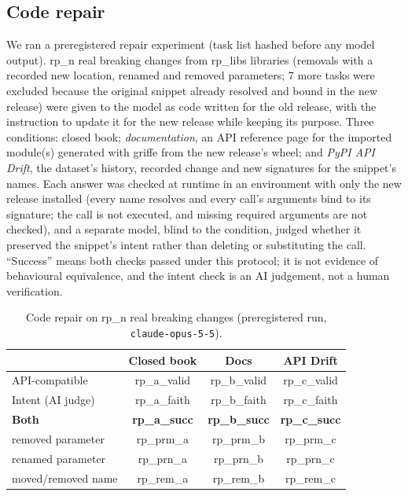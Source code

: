 \documentclass[10pt,twocolumn,letterpaper]{article}
\begin{document}
\subsection{Code repair}
We ran a preregistered repair experiment (task list hashed before any model output). {{rp_n}} real breaking changes
from {{rp_libs}} libraries (removals with a recorded new location, renamed and removed parameters; 7 more tasks were
excluded because the original snippet already resolved and bound in the new release) were given to the model as code
written for the old release, with the instruction to update it for the new release while keeping its purpose. Three
conditions: closed book; \emph{documentation}, an API reference page for the imported module(s) generated with griffe
from the new release's wheel; and \emph{PyPI API Drift}, the dataset's history, recorded change and new signatures for
the snippet's names. Each answer was checked at runtime in an environment with only the new release installed (every
name resolves and every call's arguments bind to its signature; the call is not executed, and missing required
arguments are not checked), and a separate model, blind to the condition, judged whether it preserved the snippet's
intent rather than deleting or substituting the call. ``Success'' means both checks passed under this protocol; it is
not evidence of behavioural equivalence, and the intent check is an AI judgement, not a human verification.

\begin{table}[t]\centering\small
\caption{Code repair on {{rp_n}} real breaking changes (preregistered run, \texttt{claude-opus-5-5}).}\label{tab:repair}
\begin{tabular}{@{}lccc@{}}\toprule
 & Closed book & Docs & API Drift \\\midrule
API-compatible & {{rp_a_valid}} & {{rp_b_valid}} & {{rp_c_valid}} \\
Intent (AI judge) & {{rp_a_faith}} & {{rp_b_faith}} & {{rp_c_faith}} \\
\textbf{Both} & \textbf{{{rp_a_succ}}} & \textbf{{{rp_b_succ}}} & \textbf{{{rp_c_succ}}} \\
\quad removed parameter & {{rp_prm_a}} & {{rp_prm_b}} & {{rp_prm_c}} \\
\quad renamed parameter & {{rp_prn_a}} & {{rp_prn_b}} & {{rp_prn_c}} \\
\quad moved/removed name & {{rp_rem_a}} & {{rp_rem_b}} & {{rp_rem_c}} \\\bottomrule
\end{tabular}\end{table}
\end{document}

